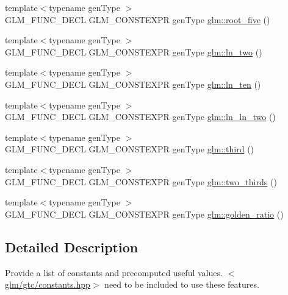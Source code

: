 \begin{DoxyCompactItemize}
\item 
{\footnotesize template$<$typename gen\-Type $>$ }\\G\-L\-M\-\_\-\-F\-U\-N\-C\-\_\-\-D\-E\-C\-L G\-L\-M\-\_\-\-C\-O\-N\-S\-T\-E\-X\-P\-R gen\-Type \hyperlink{group__gtc__constants_gae9ebbded75b53d4faeb1e4ef8b3347a2}{glm\-::root\-\_\-five} ()
\item 
{\footnotesize template$<$typename gen\-Type $>$ }\\G\-L\-M\-\_\-\-F\-U\-N\-C\-\_\-\-D\-E\-C\-L G\-L\-M\-\_\-\-C\-O\-N\-S\-T\-E\-X\-P\-R gen\-Type \hyperlink{group__gtc__constants_ga24f4d27765678116f41a2f336ab7975c}{glm\-::ln\-\_\-two} ()
\item 
{\footnotesize template$<$typename gen\-Type $>$ }\\G\-L\-M\-\_\-\-F\-U\-N\-C\-\_\-\-D\-E\-C\-L G\-L\-M\-\_\-\-C\-O\-N\-S\-T\-E\-X\-P\-R gen\-Type \hyperlink{group__gtc__constants_gaf97ebc6c059ffd788e6c4946f71ef66c}{glm\-::ln\-\_\-ten} ()
\item 
{\footnotesize template$<$typename gen\-Type $>$ }\\G\-L\-M\-\_\-\-F\-U\-N\-C\-\_\-\-D\-E\-C\-L G\-L\-M\-\_\-\-C\-O\-N\-S\-T\-E\-X\-P\-R gen\-Type \hyperlink{group__gtc__constants_gaca94292c839ed31a405ab7a81ae7e850}{glm\-::ln\-\_\-ln\-\_\-two} ()
\item 
{\footnotesize template$<$typename gen\-Type $>$ }\\G\-L\-M\-\_\-\-F\-U\-N\-C\-\_\-\-D\-E\-C\-L G\-L\-M\-\_\-\-C\-O\-N\-S\-T\-E\-X\-P\-R gen\-Type \hyperlink{group__gtc__constants_ga3077c6311010a214b69ddc8214ec13b5}{glm\-::third} ()
\item 
{\footnotesize template$<$typename gen\-Type $>$ }\\G\-L\-M\-\_\-\-F\-U\-N\-C\-\_\-\-D\-E\-C\-L G\-L\-M\-\_\-\-C\-O\-N\-S\-T\-E\-X\-P\-R gen\-Type \hyperlink{group__gtc__constants_ga9b4d2f4322edcf63a6737b92a29dd1f5}{glm\-::two\-\_\-thirds} ()
\item 
{\footnotesize template$<$typename gen\-Type $>$ }\\G\-L\-M\-\_\-\-F\-U\-N\-C\-\_\-\-D\-E\-C\-L G\-L\-M\-\_\-\-C\-O\-N\-S\-T\-E\-X\-P\-R gen\-Type \hyperlink{group__gtc__constants_ga748cf8642830657c5b7eae04d0a80899}{glm\-::golden\-\_\-ratio} ()
\end{DoxyCompactItemize}


\subsection{Detailed Description}
Provide a list of constants and precomputed useful values. $<$\hyperlink{constants_8hpp}{glm/gtc/constants.\-hpp}$>$ need to be included to use these features. 


